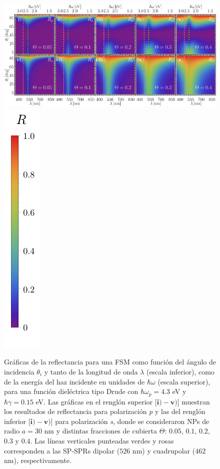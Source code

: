 	\begin{figure}[h!]\centering
\includegraphics[width = .94\linewidth	]{2-Resultados/figs/4-Wp4FSMThetaVar/0-2D_Grid.png}%
\includegraphics[scale=.89, trim={00 -5 00 00}, clip]{2-Resultados/figs/0-RBar_v}\vspace*{-.5em}
	\caption{Gráficas de la reflectancia para una FSM como función del ángulo de incidencia $\theta_i$ y tanto de la longitud de onda $\lambda$ (escala inferior), como de la energía del haz incidente en unidades de $\hbar\omega$ (escala superior), para una función dieléctrica tipo Drude con $\hbar\omega_p=4. 3$ eV  y  $\hbar\gamma=0. 15$ eV.  Las gráficas   en el renglón superior [$\mathbf{i)-v)}$]  muestran los resultados de reflectancia para  polarización \emph{p} y las del renglón inferior  [$\mathbf{i)-v)}$] para polarización  \emph{s}, donde se consideraron NPs de radio $a=30$ nm y distintas fracciones de cubierta $\Theta$: $0. 05$, $0. 1$, $0. 2$, $0. 3$ y $0. 4$. Las líneas verticales punteadas verdes y rosas corresponden a las SP-SPRs dipolar ($526$ nm) y cuadrupolar ($462$ nm), respectivamente.}	\label{fig:R-FSM}	
	\end{figure}		
					
